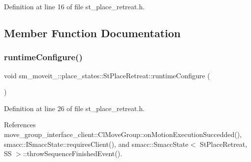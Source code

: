 Definition at line 16 of file st\+\_\+place\+\_\+retreat.\+h.



\subsection{Member Function Documentation}
\mbox{\label{structsm__moveit__3_1_1place__states_1_1StPlaceRetreat_a47d0fe7bd6b1983682b143160b59a3c1}} 
\subsubsection{\texorpdfstring{runtime\+Configure()}{runtimeConfigure()}}
{\footnotesize\ttfamily void sm\+\_\+moveit\+\_\+::place\+\_\+states\+::\+St\+Place\+Retreat\+::runtime\+Configure (\begin{DoxyParamCaption}{ }\end{DoxyParamCaption})\hspace{0.3cm}{\ttfamily [inline]}}



Definition at line 26 of file st\+\_\+place\+\_\+retreat.\+h.



References move\+\_\+group\+\_\+interface\+\_\+client\+::\+Cl\+Move\+Group\+::on\+Motion\+Execution\+Succedded(), smacc\+::\+I\+Smacc\+State\+::requires\+Client(), and smacc\+::\+Smacc\+State$<$ St\+Place\+Retreat, S\+S $>$\+::throw\+Sequence\+Finished\+Event().


